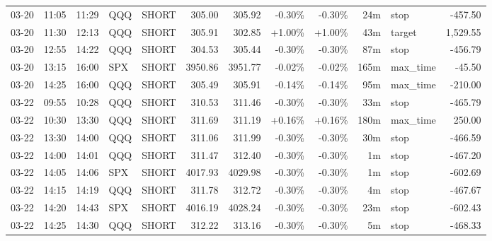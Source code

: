 \documentclass[11pt,a4paper,twoside]{article}
\begin{document}
\begin{center}
\begin{longtable}{>{\color{txtmain}}l l l l l r r r r r >{\color{txtmain}}l r}
03-20 & 11:05 & 11:29 & QQQ & SHORT & 305.00 & 305.92 & \textcolor{lossred}{-0.30\%} & \textcolor{lossred}{-0.30\%} & 24m & stop & \textcolor{lossred}{-457.50} \\
03-20 & 11:30 & 12:13 & QQQ & SHORT & 305.91 & 302.85 & \textcolor{wingreen}{+1.00\%} & \textcolor{wingreen}{+1.00\%} & 43m & target & \textcolor{wingreen}{1,529.55} \\
03-20 & 12:55 & 14:22 & QQQ & SHORT & 304.53 & 305.44 & \textcolor{lossred}{-0.30\%} & \textcolor{lossred}{-0.30\%} & 87m & stop & \textcolor{lossred}{-456.79} \\
03-20 & 13:15 & 16:00 & SPX & SHORT & 3950.86 & 3951.77 & \textcolor{lossred}{-0.02\%} & \textcolor{lossred}{-0.02\%} & 165m & max\_time & \textcolor{lossred}{-45.50} \\
03-20 & 14:25 & 16:00 & QQQ & SHORT & 305.49 & 305.91 & \textcolor{lossred}{-0.14\%} & \textcolor{lossred}{-0.14\%} & 95m & max\_time & \textcolor{lossred}{-210.00} \\
03-22 & 09:55 & 10:28 & QQQ & SHORT & 310.53 & 311.46 & \textcolor{lossred}{-0.30\%} & \textcolor{lossred}{-0.30\%} & 33m & stop & \textcolor{lossred}{-465.79} \\
03-22 & 10:30 & 13:30 & QQQ & SHORT & 311.69 & 311.19 & \textcolor{wingreen}{+0.16\%} & \textcolor{wingreen}{+0.16\%} & 180m & max\_time & \textcolor{wingreen}{250.00} \\
03-22 & 13:30 & 14:00 & QQQ & SHORT & 311.06 & 311.99 & \textcolor{lossred}{-0.30\%} & \textcolor{lossred}{-0.30\%} & 30m & stop & \textcolor{lossred}{-466.59} \\
03-22 & 14:00 & 14:01 & QQQ & SHORT & 311.47 & 312.40 & \textcolor{lossred}{-0.30\%} & \textcolor{lossred}{-0.30\%} & 1m & stop & \textcolor{lossred}{-467.20} \\
03-22 & 14:05 & 14:06 & SPX & SHORT & 4017.93 & 4029.98 & \textcolor{lossred}{-0.30\%} & \textcolor{lossred}{-0.30\%} & 1m & stop & \textcolor{lossred}{-602.69} \\
03-22 & 14:15 & 14:19 & QQQ & SHORT & 311.78 & 312.72 & \textcolor{lossred}{-0.30\%} & \textcolor{lossred}{-0.30\%} & 4m & stop & \textcolor{lossred}{-467.67} \\
03-22 & 14:20 & 14:43 & SPX & SHORT & 4016.19 & 4028.24 & \textcolor{lossred}{-0.30\%} & \textcolor{lossred}{-0.30\%} & 23m & stop & \textcolor{lossred}{-602.43} \\
03-22 & 14:25 & 14:30 & QQQ & SHORT & 312.22 & 313.16 & \textcolor{lossred}{-0.30\%} & \textcolor{lossred}{-0.30\%} & 5m & stop & \textcolor{lossred}{-468.33} \\

\end{longtable}
\end{center}
\end{document}
